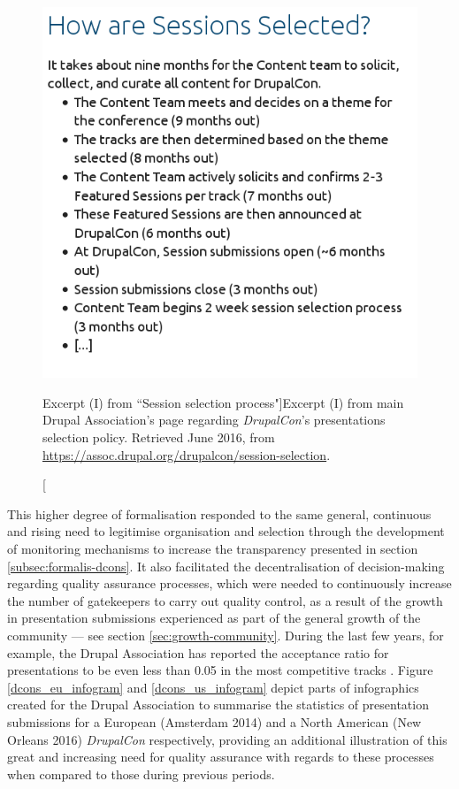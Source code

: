 \begin{figure}[H]
\centering
\includegraphics[scale=0.5]{img/quotes_replacement/dcon_sesssion_policy_june16_02.png}
\caption[Excerpt (I) from ``Session selection process"]{Excerpt (I) from main Drupal Association's page regarding \textit{DrupalCon}'s presentations selection policy. Retrieved  June 2016, from \url{https://assoc.drupal.org/drupalcon/session-selection}.}
\label{da-dcon-selec01}
\end{figure}

This higher degree of formalisation responded to the same general, continuous and rising need to legitimise organisation and selection through the development of monitoring mechanisms to increase the transparency presented in section \ref{subsec:formalis-dcons}. It also facilitated the decentralisation of decision-making regarding quality assurance processes, which were needed to continuously increase the number of gatekeepers to carry out quality control, as a result of the growth in presentation submissions experienced as part of the general growth of the community --- see section \ref{sec:growth-community}. During the last few years, for example, the Drupal Association has reported the acceptance ratio for presentations to be even less than 0.05 in the most competitive tracks \parencite{drupalcon-submissions-rate:2016:Online}. Figure \ref{dcons_eu_infogram} and \ref{dcons_us_infogram} depict parts of infographics created for the Drupal Association to summarise the statistics of presentation submissions for a European (Amsterdam 2014) and a North American (New Orleans 2016) \textit{DrupalCon} respectively, providing an additional illustration of this great and increasing need for quality assurance with regards to these processes when compared to those during previous periods.

